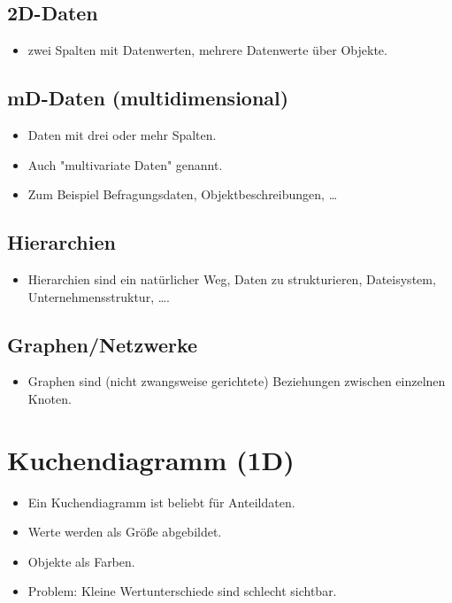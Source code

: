 		\subsection{2D-Daten}
			\begin{itemize}
				\item zwei Spalten mit Datenwerten, \zB mehrere Datenwerte über Objekte.
			\end{itemize}

		\subsection{mD-Daten (multidimensional)}
			\begin{itemize}
				\item Daten mit drei oder mehr Spalten.
				\item Auch "multivariate Daten" genannt.
				\item Zum Beispiel Befragungsdaten, Objektbeschreibungen, \dots
			\end{itemize}

		\subsection{Hierarchien}
			\begin{itemize}
				\item Hierarchien sind ein natürlicher Weg, Daten zu strukturieren, \bspw Dateisystem, Unternehmensstruktur, \dots.
			\end{itemize}

		\subsection{Graphen/Netzwerke}
			\begin{itemize}
				\item Graphen sind (nicht zwangsweise gerichtete) Beziehungen zwischen einzelnen Knoten.
			\end{itemize}

	\section{Kuchendiagramm (1D)}
		\begin{itemize}
			\item Ein Kuchendiagramm ist beliebt für Anteildaten.
			\item Werte werden als Größe abgebildet.
			\item Objekte als Farben.
			\item Problem: Kleine Wertunterschiede sind schlecht sichtbar.
		\end{itemize}

